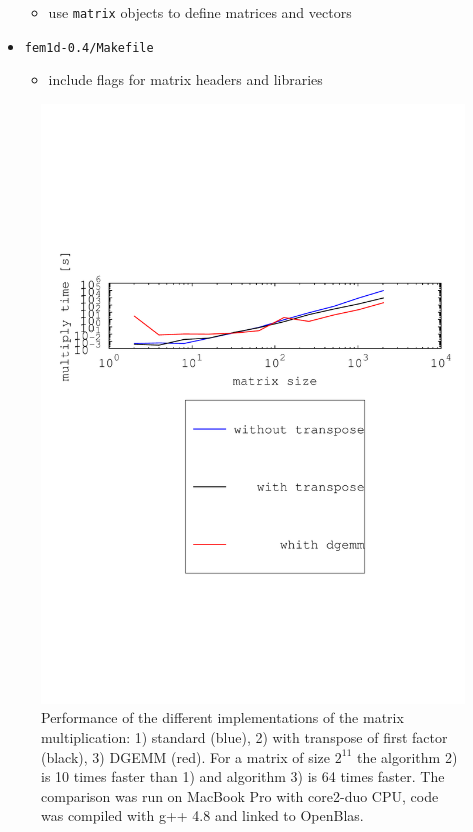 \documentclass[smaller,a4paper,allowframebreaks]{beamer}
\begin{document}
\begin{frame}[allowframebreaks]
\begin{itemize}
\begin{itemize}
\item use \lstinline[language=C++]{matrix} objects to define matrices and vectors\\[3mm]
\end{itemize}
\item {\tt fem1d-0.4/Makefile}\\[3mm]
\begin{itemize}
\item include flags for matrix headers and libraries\\[3mm]
\end{itemize}
\end{itemize}
\end{frame}

\begin{frame}
\begin{figure}
\begin{center}
\includegraphics[width=.9\linewidth]{./images/speedup.pdf}
\caption{Performance of the different implementations of the matrix multiplication: 
1) standard (blue), 2) with transpose of first factor (black), 3) DGEMM (red). 
For a matrix of size $2^{11}$ the algorithm 2) is 10 times faster than 1) and algorithm 3) 
is 64 times faster. The comparison was run on MacBook Pro with core2-duo CPU, 
code was compiled with g++ 4.8 and linked to OpenBlas.}
\end{center}
\end{figure}
\end{frame}
\end{document}
